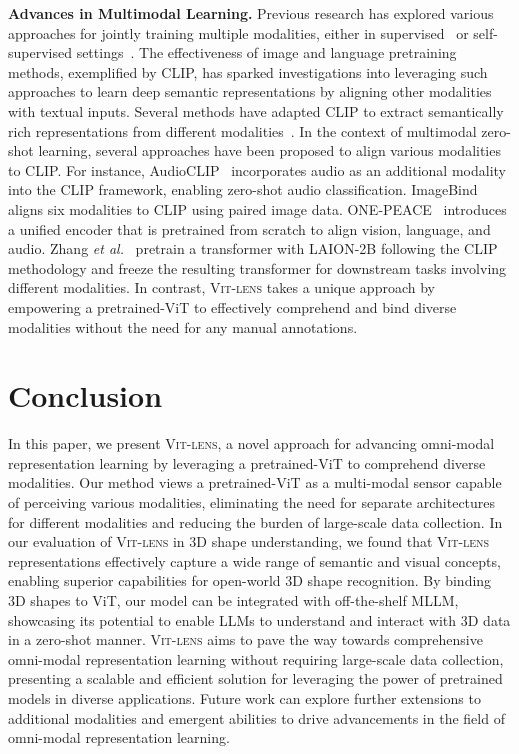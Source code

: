 \documentclass{article}
\newcommand{\ptvit}{pretrained-ViT\xspace}
\newcommand{\vit}{ViT\xspace}
\newcommand{\methodname}{{\scshape Vit-lens}\xspace}
\begin{document}
\textbf{Advances in Multimodal Learning.} Previous research has explored various approaches for jointly training multiple modalities, either in supervised~\cite{girdhar2022omnivore,likhosherstov2021polyvit, gao2020multi} or self-supervised settings~\cite{girdhar2023omnimae,arandjelovic2017look,tian2020contrastive,morgado2021audio, lin2022egocentric}. The effectiveness of image and language pretraining methods, exemplified by CLIP, has sparked investigations into leveraging such approaches to learn deep semantic representations by aligning other modalities with textual inputs. Several methods have adapted CLIP to extract semantically rich representations from different modalities~\cite{luo2022clip4clip,lin2022frozen,fang2021clip2video,xue2022clip-vip, gao2023mist}.
In the context of multimodal zero-shot learning, several approaches have been proposed to align various modalities to CLIP. For instance, AudioCLIP~\cite{guzhov2022audioclip} incorporates audio as an additional modality into the CLIP framework, enabling zero-shot audio classification. ImageBind~\cite{girdhar2023imagebind} aligns six modalities to CLIP using paired image data. ONE-PEACE~\cite{wang2023onepeace} introduces a unified encoder that is pretrained from scratch to align vision, language, and audio. Zhang \emph{et al.}~\cite{zhang2023metatransformer} pretrain a transformer with LAION-2B following the CLIP methodology and freeze the resulting transformer for downstream tasks involving different modalities. In contrast, \methodname takes a unique approach by empowering a \ptvit to effectively comprehend and bind diverse modalities without the need for any manual annotations. 




\section{Conclusion}
In this paper,  we present \methodname, a novel approach for advancing omni-modal representation learning by leveraging a \ptvit to comprehend diverse modalities. Our method views a \ptvit as a multi-modal sensor capable of perceiving various modalities, eliminating the need for separate architectures for different modalities and reducing the burden of large-scale data collection. 
In our evaluation of \methodname in 3D shape understanding, we found that \methodname representations effectively capture a wide range of semantic and visual concepts, enabling superior capabilities for open-world 3D shape recognition. By binding 3D shapes to \vit, our model can be integrated with off-the-shelf MLLM, showcasing its potential to enable LLMs to understand and interact with 3D data in a zero-shot manner.
\methodname aims to pave the way towards comprehensive omni-modal representation learning without requiring large-scale data collection, presenting a scalable and efficient solution for leveraging the power of pretrained models in diverse applications. Future work can explore further extensions to additional modalities and emergent abilities to drive advancements in the field of omni-modal representation learning.



\clearpage



\end{document}
